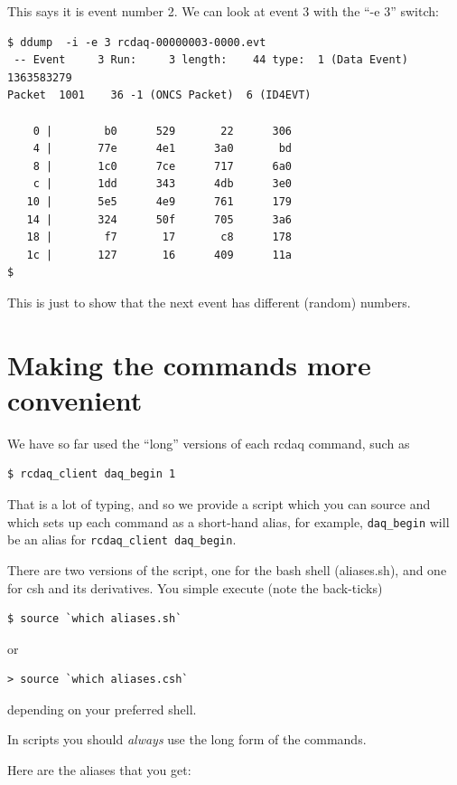 \documentclass{article}[11pt]
\begin{document}
This says it is event number 2. We can look at event 3 with the ``-e 3'' switch:

\begin{verbatim}
$ ddump  -i -e 3 rcdaq-00000003-0000.evt
 -- Event     3 Run:     3 length:    44 type:  1 (Data Event)  1363583279
Packet  1001    36 -1 (ONCS Packet)  6 (ID4EVT)

    0 |        b0      529       22      306 
    4 |       77e      4e1      3a0       bd 
    8 |       1c0      7ce      717      6a0 
    c |       1dd      343      4db      3e0 
   10 |       5e5      4e9      761      179 
   14 |       324      50f      705      3a6 
   18 |        f7       17       c8      178 
   1c |       127       16      409      11a 
$ 
\end{verbatim}

This is just to show that the next event has different (random) numbers. 


\section{Making the commands more convenient}
\label{convenience}

We have so far used the ``long'' versions of each rcdaq command, such as

\begin{verbatim}
$ rcdaq_client daq_begin 1
\end{verbatim}

That is a lot of typing, and so we provide a script which you can source and
which sets up each command as a short-hand alias, for example,
\verb|daq_begin| will be an alias for \verb|rcdaq_client daq_begin|. 

There are two versions of the script, one for the bash shell (aliases.sh), and 
one for csh and its derivatives. You simple execute (note the back-ticks)

\begin{verbatim}
$ source `which aliases.sh`
\end{verbatim}

 or
 
\begin{verbatim}
> source `which aliases.csh`
\end{verbatim}

depending on your preferred shell. 

In scripts you should \emph{always} use the long form of the commands. 

Here are the aliases that you get:
\end{document}
